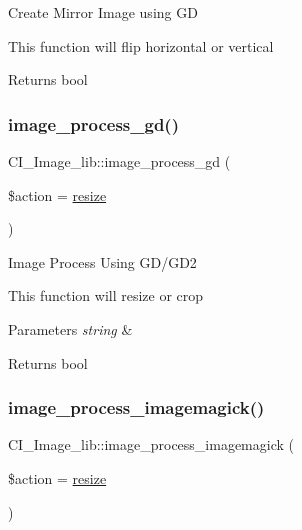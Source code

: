 Create Mirror Image using GD

This function will flip horizontal or vertical

\begin{DoxyReturn}{Returns}
bool 
\end{DoxyReturn}
\mbox{\label{class_c_i___image__lib_a023d856f5264bc8d78f3e32faa912967}} 
\subsubsection{\texorpdfstring{image\+\_\+process\+\_\+gd()}{image\_process\_gd()}}
{\footnotesize\ttfamily C\+I\+\_\+\+Image\+\_\+lib\+::image\+\_\+process\+\_\+gd (\begin{DoxyParamCaption}\item[{}]{\$action = {\ttfamily \textquotesingle{}\mbox{\hyperlink{class_c_i___image__lib_a661e23a05684c47d1bcdadd088905dbe}{resize}}\textquotesingle{}} }\end{DoxyParamCaption})}

Image Process Using G\+D/\+G\+D2

This function will resize or crop


\begin{DoxyParams}{Parameters}
{\em string} & \\
\hline
\end{DoxyParams}
\begin{DoxyReturn}{Returns}
bool 
\end{DoxyReturn}
\mbox{\label{class_c_i___image__lib_ae9cc2ef57567c7be1b54e8a92bef5367}} 
\subsubsection{\texorpdfstring{image\+\_\+process\+\_\+imagemagick()}{image\_process\_imagemagick()}}
{\footnotesize\ttfamily C\+I\+\_\+\+Image\+\_\+lib\+::image\+\_\+process\+\_\+imagemagick (\begin{DoxyParamCaption}\item[{}]{\$action = {\ttfamily \textquotesingle{}\mbox{\hyperlink{class_c_i___image__lib_a661e23a05684c47d1bcdadd088905dbe}{resize}}\textquotesingle{}} }\end{DoxyParamCaption})}

